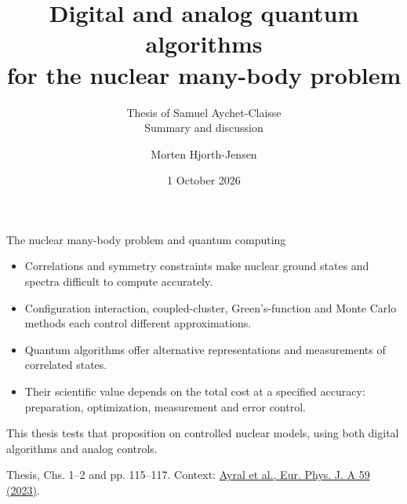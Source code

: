 \documentclass[11pt,aspectratio=169]{beamer}
\title[Quantum algorithms for nuclei]{Digital and analog quantum algorithms\\for the nuclear many-body problem}
\subtitle{Thesis of Samuel Aychet-Claisse\\Summary and discussion}
\author{Morten Hjorth-Jensen}
\institute{University of Oslo\\Defense at Universit\'e Paris-Saclay}
\date{1 October 2026}
\newcommand{\src}[1]{\par\vfill{\fontsize{7}{8}\selectfont\color{gray}#1\par}}
\begin{document}
\begin{frame}
\titlepage
{}
\end{frame}

\begin{frame}{The nuclear many-body problem and quantum computing}
\begin{itemize}\setlength\itemsep{.7em}
\item Correlations and symmetry constraints make nuclear ground states and spectra difficult to compute accurately.
\item Configuration interaction, coupled-cluster, Green's-function and Monte Carlo methods each control different approximations.
\item Quantum algorithms offer alternative representations and measurements of correlated states.
\item Their scientific value depends on the \alert{total cost at a specified accuracy}: preparation, optimization, measurement and error control.
\end{itemize}
\medskip
This thesis tests that proposition on controlled nuclear models, using both digital algorithms and analog controls.
\src{Thesis, Chs. 1--2 and pp. 115--117. Context: \href{https://doi.org/10.1140/epja/s10050-023-01141-1}{Ayral et al., Eur. Phys. J. A 59 (2023)}.}
\end{frame}
\end{document}
